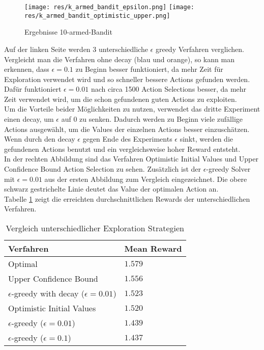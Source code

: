 \documentclass[11pt]{scrartcl}
\begin{document}
\begin{figure}[htp]
\centering
\texttt{[image: res/k\_armed\_bandit\_epsilon.png]}
\texttt{[image: res/k\_armed\_bandit\_optimistic\_upper.png]}
\caption{Ergebnisse 10-armed-Bandit}
\label{fig:karmed_bandit}
\end{figure}

\noindent
Auf der linken Seite werden 3 unterschiedliche $\epsilon$ greedy Verfahren verglichen.
Vergleicht man die Verfahren ohne decay (blau und orange), so kann man erkennen, dass
$\epsilon = 0.1$ zu Beginn besser funktioniert, da mehr Zeit für Exploration verwendet
wird und so schneller bessere Actions gefunden werden. Dafür funktioniert $\epsilon =
0.01$ nach circa 1500 Action Selections besser, da mehr Zeit verwendet wird, um die schon
gefundenen guten Actions zu exploiten.\\
Um die Vorteile beider Möglichkeiten zu nutzen, verwendet das dritte Experiment einen
decay, um $\epsilon$ auf $0$ zu senken. Dadurch werden zu Beginn viele zufällige Actions
ausgewählt, um die Values der einzelnen Actions besser einzuschätzen. Wenn durch den decay
$\epsilon$ gegen Ende des Experiments $\epsilon$ sinkt, werden die gefundenen Actions
benutzt und ein vergleichsweise hoher Reward entsteht.\\
In der rechten Abbildung sind das Verfahren Optimistic Initial Values und Upper Confidence
Bound Action Selection zu sehen. Zusätzlich ist der $\epsilon$-greedy Solver mit
$\epsilon=0.01$ aus der ersten Abbildung zum Vergleich eingezeichnet. Die obere schwarz
gestrichelte Linie deutet das Value der optimalen Action an.\\
Tabelle \ref{tab:explorationstrategies} zeigt die erreichten durchschnittlichen Rewards
der unterschiedlichen Verfahren.

\begin{table}[h]
  \begin{center}
    \begin{tabular}{l | l}
      \textbf{Verfahren} & \textbf{Mean Reward} \\
      \hline
      Optimal & $1.579$\\
      Upper Confidence Bound & $1.556$ \\
      $\epsilon$-greedy with decay ($\epsilon=0.01$) & $1.523$ \\
      Optimistic Initial Values & $1.520$ \\
      $\epsilon$-greedy ($\epsilon=0.01$) & $1.439$ \\
      $\epsilon$-greedy ($\epsilon=0.1$) & $1.437$ \\
    \end{tabular}

    \caption[ExplorationStrategies]{Vergleich unterschiedlicher Exploration Strategien}
    \label{tab:explorationstrategies}
  \end{center}
\end{table}
\end{document}
